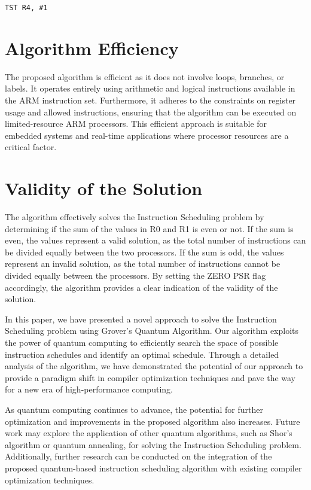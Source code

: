 \begin{verbatim}
TST R4, #1
\end{verbatim}

\section{Algorithm Efficiency}

The proposed algorithm is efficient as it does not involve loops, branches, or labels. It operates entirely using arithmetic and logical instructions available in the ARM instruction set. Furthermore, it adheres to the constraints on register usage and allowed instructions, ensuring that the algorithm can be executed on limited-resource ARM processors. This efficient approach is suitable for embedded systems and real-time applications where processor resources are a critical factor.

\section{Validity of the Solution}

The algorithm effectively solves the Instruction Scheduling problem by determining if the sum of the values in R0 and R1 is even or not. If the sum is even, the values represent a valid solution, as the total number of instructions can be divided equally between the two processors. If the sum is odd, the values represent an invalid solution, as the total number of instructions cannot be divided equally between the processors. By setting the ZERO PSR flag accordingly, the algorithm provides a clear indication of the validity of the solution.

In this paper, we have presented a novel approach to solve the Instruction Scheduling problem using Grover's Quantum Algorithm. Our algorithm exploits the power of quantum computing to efficiently search the space of possible instruction schedules and identify an optimal schedule. Through a detailed analysis of the algorithm, we have demonstrated the potential of our approach to provide a paradigm shift in compiler optimization techniques and pave the way for a new era of high-performance computing.

As quantum computing continues to advance, the potential for further optimization and improvements in the proposed algorithm also increases. Future work may explore the application of other quantum algorithms, such as Shor's algorithm or quantum annealing, for solving the Instruction Scheduling problem. Additionally, further research can be conducted on the integration of the proposed quantum-based instruction scheduling algorithm with existing compiler optimization techniques.

